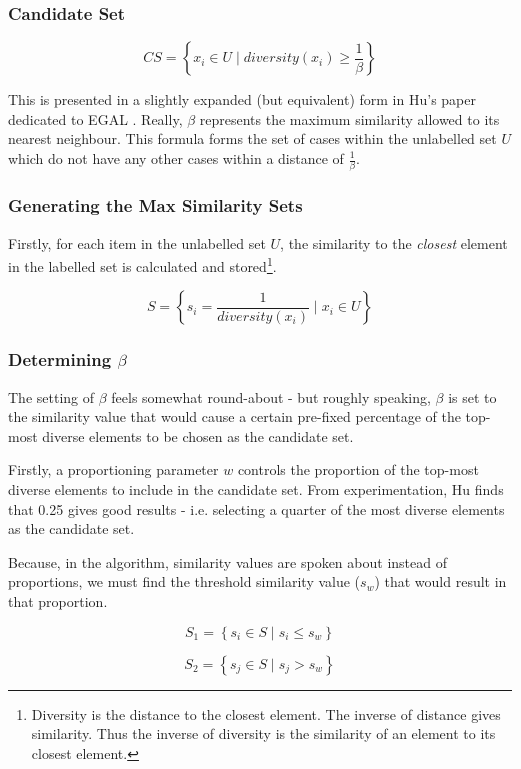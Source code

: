 \documentclass[a4paper,11pt]{report}
\begin{document}
\subsubsection{Candidate Set}
\[
CS=\left\{ x_{i}\in U\mid diversity(x_{i})\geq\frac{1}{\beta}\right\} 
\]

This is presented in a slightly expanded (but equivalent) form in Hu's paper dedicated to EGAL \citep{Hu2010}. Really, $\beta$ represents the maximum similarity allowed to its nearest neighbour. This formula forms the set of cases within the unlabelled set $U$ which do not have any other cases within a distance of $\frac{1}{\beta}$.

\subsubsection{Generating the Max Similarity Sets}

Firstly, for each item in the unlabelled set $U$, the similarity to the \emph{closest} element in the labelled set is calculated and stored\footnote{Diversity is the distance to the closest element. The inverse of distance gives similarity. Thus the inverse of diversity is the similarity of an element to its closest element.}.

\[
S=\left\{ s_{i}=\frac{1}{diversity(x_{i})}\mid x_{i}\in U\right\} 
\]

\subsubsection{Determining $\beta$}
The setting of $\beta$ feels somewhat round-about - but roughly speaking, $\beta$ is set to the similarity value that would cause a certain pre-fixed percentage of the top-most diverse elements to be chosen as the candidate set.

Firstly, a proportioning parameter $w$ controls the proportion of the top-most diverse elements to include in the candidate set. From experimentation, Hu finds that 0.25 gives good results - i.e. selecting a quarter of the most diverse elements as the candidate set.

Because, in the algorithm, similarity values are spoken about instead of proportions, we must find the threshold similarity value ($s_{w}$) that would result in that proportion.

\[
S_{1}=\left\{ s_{i}\in S\mid s_{i}\leq s_{w}\right\} 
\]

\[
S_{2}=\left\{ s_{j}\in S\mid s_{j}>s_{w}\right\} 
\]
\end{document}

